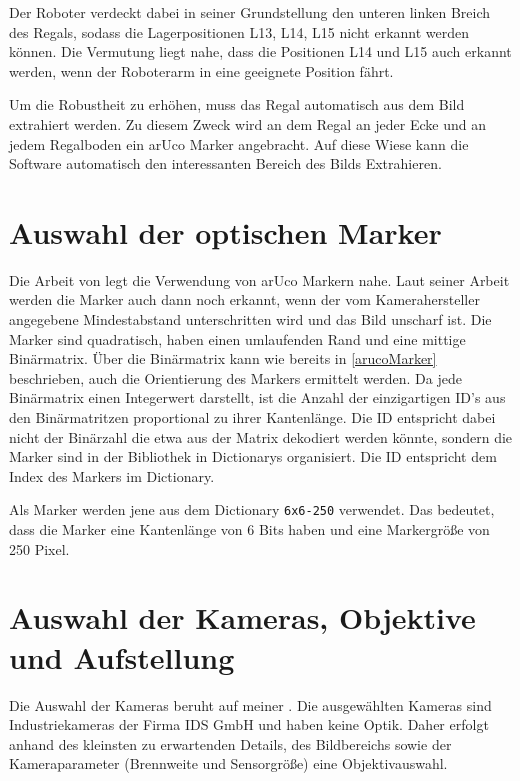    Der Roboter verdeckt dabei in seiner Grundstellung den unteren linken Breich des Regals, sodass die Lagerpositionen L13, L14, L15 nicht erkannt werden können. 
    Die Vermutung liegt nahe, dass die Positionen L14 und L15 auch erkannt werden, wenn der Roboterarm in eine geeignete Position fährt. 

    Um die Robustheit zu erhöhen, muss das Regal automatisch aus dem Bild extrahiert werden. 
    Zu diesem Zweck wird an dem Regal an jeder Ecke und an jedem Regalboden ein arUco Marker angebracht.
    Auf diese Wiese kann die Software automatisch den interessanten Bereich des Bilds Extrahieren. 
    
    
    \section {Auswahl der optischen Marker}

    Die Arbeit von \cite[Sebastian Hübler]{Hübler2019} legt die Verwendung von arUco Markern nahe. 
    Laut seiner Arbeit werden die Marker auch dann noch erkannt, wenn der vom Kamerahersteller angegebene Mindestabstand unterschritten wird und das Bild unscharf ist. 
    Die Marker sind quadratisch, haben einen umlaufenden Rand und eine mittige Binärmatrix. 
    Über die Binärmatrix kann wie bereits in \ref{arucoMarker} beschrieben, auch die Orientierung des Markers ermittelt werden.
    Da jede Binärmatrix einen Integerwert darstellt, ist die Anzahl der einzigartigen ID's aus den Binärmatritzen proportional zu ihrer Kantenlänge.
    Die ID entspricht dabei nicht der Binärzahl die etwa aus der Matrix dekodiert werden könnte, sondern die Marker sind in der \cite[OpenCV]{OpenCVaruco} Bibliothek in
    Dictionarys organisiert. Die ID entspricht dem Index des Markers im Dictionary.

    Als Marker werden jene aus dem Dictionary \verb|6x6-250| verwendet. Das bedeutet, dass die Marker eine Kantenlänge von 6 Bits haben und eine Markergröße von 250 Pixel.

    \section {Auswahl der Kameras, Objektive und Aufstellung}

    Die Auswahl der Kameras beruht auf meiner \cite[Semesterarbeit]{Semesterarbeit}. 
    Die ausgewählten Kameras sind Industriekameras der Firma IDS GmbH und haben keine Optik. 
    Daher erfolgt anhand des kleinsten zu erwartenden Details, des Bildbereichs sowie der Kameraparameter (Brennweite und Sensorgröße) eine Objektivauswahl. 

